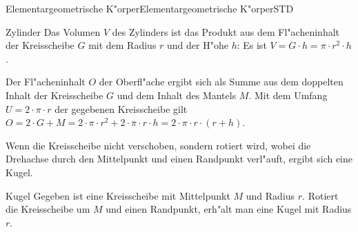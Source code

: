 \begin{MXContent}{Elementargeometrische K"orper}{Elementargeometrische K"orper}{STD}
\begin{MXInfo}{Zylinder}
Das Volumen $V$ des Zylinders ist das Produkt aus dem Fl"acheninhalt der 
Kreisscheibe $G$ mit dem Radius $r$ und der H"ohe $h$: 
Es ist $V = G \cdot h = \pi \cdot r^2 \cdot h$.

Der Fl"acheninhalt $O$ der Oberfl"ache ergibt sich als Summe aus dem doppelten
Inhalt der Kreisscheibe $G$ und dem Inhalt des Mantels $M$.
Mit dem Umfang $U = 2 \cdot \pi \cdot r$ der gegebenen Kreisscheibe gilt 
$O = 2 \cdot G + M = 2 \cdot \pi \cdot r^2 + 2 \cdot \pi \cdot r \cdot h %
 = 2 \cdot \pi \cdot r \cdot (r + h)$.
\end{MXInfo}

Wenn die Kreisscheibe nicht verschoben, sondern rotiert wird, wobei die 
Drehachse durch den Mittelpunkt und einen Randpunkt verl"auft, ergibt sich
eine Kugel.

\begin{MXInfo}{Kugel}
Gegeben ist eine Kreisscheibe mit Mittelpunkt $M$ und Radius $r$. Rotiert die
Kreisscheibe um $M$ und einen Randpunkt, erh"alt man eine Kugel mit 
Radius $r$.

\begin{center}
\end{center}


\end{MXInfo}
\end{MXContent}
